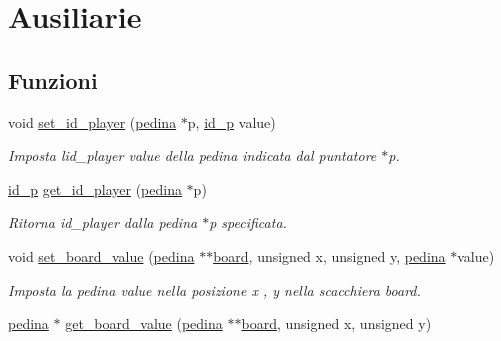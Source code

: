 \hypertarget{group__Funzioni}{}\section{Ausiliarie}
\label{group__Funzioni}
\subsection*{Funzioni}
\begin{DoxyCompactItemize}
\item 
void \hyperlink{group__Funzioni_gabbdcb7fca0fe313ecc63bc2ba1a73d8e}{set\+\_\+id\+\_\+player} (\hyperlink{ml__lib_8h_a71fee95122b31f5cb0b07d9c16ffa3a5}{pedina} $\ast$p, \hyperlink{ml__lib_8h_a0330ff92cbc796e96c3ce3e4401bf1e1}{id\+\_\+p} value)
\begin{DoxyCompactList}\small\item\em Imposta l\textquotesingle{}id\+\_\+player {\itshape value} della pedina indicata dal puntatore {\itshape $\ast$p}. \end{DoxyCompactList}\item 
\hyperlink{ml__lib_8h_a0330ff92cbc796e96c3ce3e4401bf1e1}{id\+\_\+p} \hyperlink{group__Funzioni_gaeebe06189e2bd221a0e65b7d15f6b1b5}{get\+\_\+id\+\_\+player} (\hyperlink{ml__lib_8h_a71fee95122b31f5cb0b07d9c16ffa3a5}{pedina} $\ast$p)
\begin{DoxyCompactList}\small\item\em Ritorna {\itshape id\+\_\+player} dalla pedina {\itshape $\ast$p} specificata. \end{DoxyCompactList}\item 
void \hyperlink{group__Funzioni_gaf41d60dd64b7eb3f58f9d47100461310}{set\+\_\+board\+\_\+value} (\hyperlink{ml__lib_8h_a71fee95122b31f5cb0b07d9c16ffa3a5}{pedina} $\ast$$\ast$\hyperlink{ml__main_8c_a62a3fe3d1df9ff58883b669f7f24e516}{board}, unsigned x, unsigned y, \hyperlink{ml__lib_8h_a71fee95122b31f5cb0b07d9c16ffa3a5}{pedina} $\ast$value)
\begin{DoxyCompactList}\small\item\em Imposta la pedina {\itshape value} nella posizione {\itshape x} , {\itshape y} nella scacchiera {\itshape board}. \end{DoxyCompactList}\item 
\hyperlink{ml__lib_8h_a71fee95122b31f5cb0b07d9c16ffa3a5}{pedina} $\ast$ \hyperlink{group__Funzioni_ga98af825db34dd320535062aa23675a71}{get\+\_\+board\+\_\+value} (\hyperlink{ml__lib_8h_a71fee95122b31f5cb0b07d9c16ffa3a5}{pedina} $\ast$$\ast$\hyperlink{ml__main_8c_a62a3fe3d1df9ff58883b669f7f24e516}{board}, unsigned x, unsigned y)

\end{DoxyCompactItemize}
